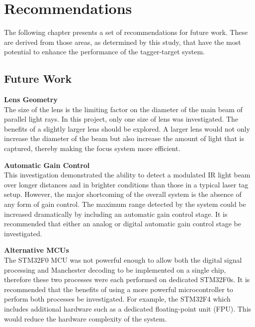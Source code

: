 \chapter{Recommendations}
\label{ch_recommendations}



The following chapter presents a set of recommendations for future work. These are derived from those areas, as determined by this study, that have the most potential to enhance the performance of the tagger-target system.

\section{Future Work}

\textbf{Lens Geometry}\\
The size of the lens is the limiting factor on the diameter of the main beam of parallel light rays. In this project, only one size of lens was investigated. The benefits of a slightly larger lens should be explored. A larger lens would not only increase the diameter of the beam but also increase the amount of light that is captured, thereby making the focus system more efficient.

\textbf{Automatic Gain Control}\\
This investigation demonstrated the ability to detect a modulated IR light beam over longer distances and in brighter conditions than those in a typical laser tag setup. However, the major shortcoming of the overall system is the absence of any form of gain control. The maximum range detected by the system could be increased dramatically by including an automatic gain control stage. It is recommended that either an analog or digital automatic gain control stage be investigated.

\textbf{Alternative MCUs}\\
The STM32F0 MCU was not powerful enough to allow both the digital signal processing and Manchester decoding to be implemented on a single chip, therefore these two processes were each performed on dedicated STM32F0s. It is recommended that the benefits of using a more powerful microcontroller to perform both processes be investigated. For example, the STM32F4 which includes additional hardware such as a dedicated floating-point unit (FPU). This would reduce the hardware complexity of the system.

